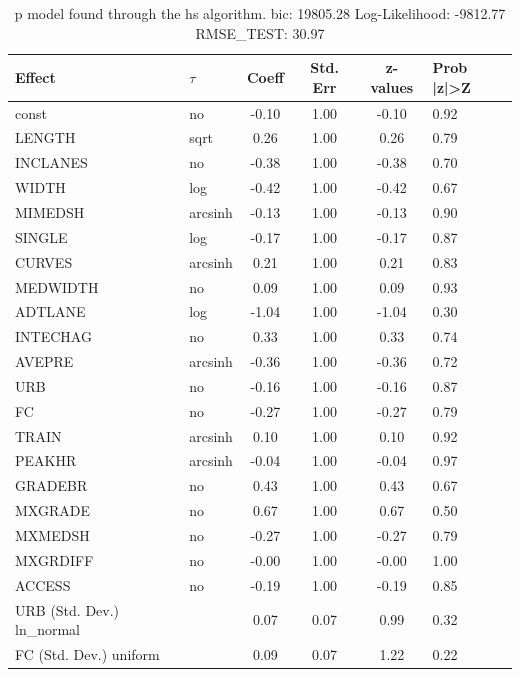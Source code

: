 \begin{table}
	\caption{p model found through the hs algorithm. bic: 19805.28 Log-Likelihood: -9812.77 RMSE_TEST: 30.97}
	\begin{center}
		\begin{tabular}{|l|l|c|c|c|l|}
			\hline
			Effect & $\tau$ & Coeff & Std. Err & z-values & Prob |z|>Z \\
			\hline
			const & no & -0.10 & 1.00 & -0.10 & 0.92 \\
			\hline
			LENGTH & sqrt & 0.26 & 1.00 & 0.26 & 0.79 \\
			\hline
			INCLANES & no & -0.38 & 1.00 & -0.38 & 0.70 \\
			\hline
			WIDTH & log & -0.42 & 1.00 & -0.42 & 0.67 \\
			\hline
			MIMEDSH & arcsinh & -0.13 & 1.00 & -0.13 & 0.90 \\
			\hline
			SINGLE & log & -0.17 & 1.00 & -0.17 & 0.87 \\
			\hline
			CURVES & arcsinh & 0.21 & 1.00 & 0.21 & 0.83 \\
			\hline
			MEDWIDTH & no & 0.09 & 1.00 & 0.09 & 0.93 \\
			\hline
			ADTLANE & log & -1.04 & 1.00 & -1.04 & 0.30 \\
			\hline
			INTECHAG & no & 0.33 & 1.00 & 0.33 & 0.74 \\
			\hline
			AVEPRE & arcsinh & -0.36 & 1.00 & -0.36 & 0.72 \\
			\hline
			URB & no & -0.16 & 1.00 & -0.16 & 0.87 \\
			\hline
			FC & no & -0.27 & 1.00 & -0.27 & 0.79 \\
			\hline
			TRAIN & arcsinh & 0.10 & 1.00 & 0.10 & 0.92 \\
			\hline
			PEAKHR & arcsinh & -0.04 & 1.00 & -0.04 & 0.97 \\
			\hline
			GRADEBR & no & 0.43 & 1.00 & 0.43 & 0.67 \\
			\hline
			MXGRADE & no & 0.67 & 1.00 & 0.67 & 0.50 \\
			\hline
			MXMEDSH & no & -0.27 & 1.00 & -0.27 & 0.79 \\
			\hline
			MXGRDIFF & no & -0.00 & 1.00 & -0.00 & 1.00 \\
			\hline
			ACCESS & no & -0.19 & 1.00 & -0.19 & 0.85 \\
			\hline
			URB (Std. Dev.) ln_normal &  & 0.07 & 0.07 & 0.99 & 0.32 \\
			\hline
			FC (Std. Dev.) uniform &  & 0.09 & 0.07 & 1.22 & 0.22 \\

\end{tabular}
\end{center}
\end{table}
